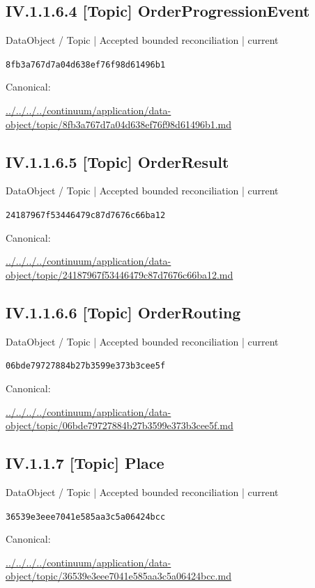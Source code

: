 \documentclass[10pt,a4paper]{article}
\begin{document}
\subsection*{IV.1.1.6.4 [Topic] OrderProgressionEvent}
\label{element-8fb3a767d7a04d638ef76f98d61496b1}
{\small DataObject / Topic | Accepted bounded reconciliation | current}\par
\texttt{8fb3a767d7a04d638ef76f98d61496b1}\par
Canonical: \par
{\footnotesize\url{../../../../continuum/application/data-object/topic/8fb3a767d7a04d638ef76f98d61496b1.md}}\par
\subsection*{IV.1.1.6.5 [Topic] OrderResult}
\label{element-24187967f53446479c87d7676c66ba12}
{\small DataObject / Topic | Accepted bounded reconciliation | current}\par
\texttt{24187967f53446479c87d7676c66ba12}\par
Canonical: \par
{\footnotesize\url{../../../../continuum/application/data-object/topic/24187967f53446479c87d7676c66ba12.md}}\par
\subsection*{IV.1.1.6.6 [Topic] OrderRouting}
\label{element-06bde79727884b27b3599e373b3cee5f}
{\small DataObject / Topic | Accepted bounded reconciliation | current}\par
\texttt{06bde79727884b27b3599e373b3cee5f}\par
Canonical: \par
{\footnotesize\url{../../../../continuum/application/data-object/topic/06bde79727884b27b3599e373b3cee5f.md}}\par
\subsection*{IV.1.1.7 [Topic] Place}
\label{element-36539e3eee7041e585aa3c5a06424bcc}
{\small DataObject / Topic | Accepted bounded reconciliation | current}\par
\texttt{36539e3eee7041e585aa3c5a06424bcc}\par
Canonical: \par
{\footnotesize\url{../../../../continuum/application/data-object/topic/36539e3eee7041e585aa3c5a06424bcc.md}}\par
\end{document}
